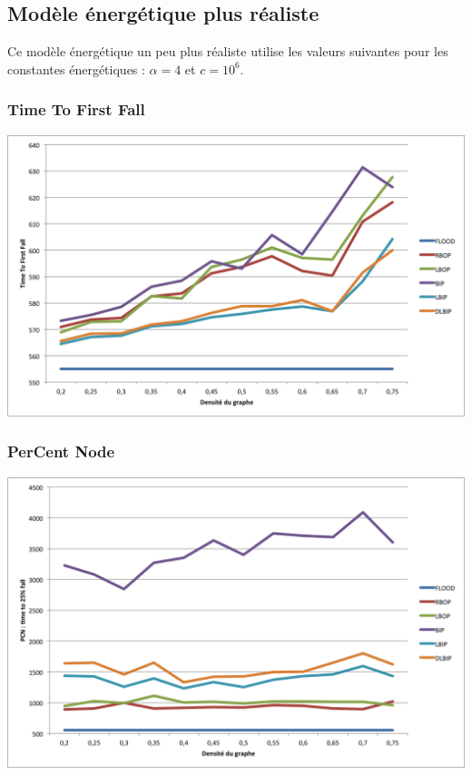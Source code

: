 \subsection{Modèle énergétique plus réaliste}
Ce modèle énergétique un peu plus réaliste utilise les valeurs suivantes pour les constantes énergétiques : $\alpha = 4$ et $c = 10^6$.

\subsubsection{Time To First Fall}
\begin{bigcenter}
\includegraphics[scale=0.9]{Simus/ttff_4_10p6}
\end{bigcenter}


\subsubsection{PerCent Node}
\begin{bigcenter}
\includegraphics[scale=0.9]{Simus/pcn_4_10p6}
\end{bigcenter}


